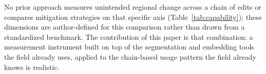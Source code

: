 \begin{table}[H]
\caption{Capability Comparison of Related Approaches}
\label{tab:capability}
\centering
\renewcommand{\arraystretch}{1.05}
\end{table}

No prior approach measures unintended regional change across a chain of edits or compares mitigation strategies on that specific axis (Table~\ref{tab:capability}); these dimensions are author-defined for this comparison rather than drawn from a standardized benchmark. The contribution of this paper is that combination: a measurement instrument built on top of the segmentation and embedding tools the field already uses, applied to the chain-based usage pattern the field already knows is realistic.
